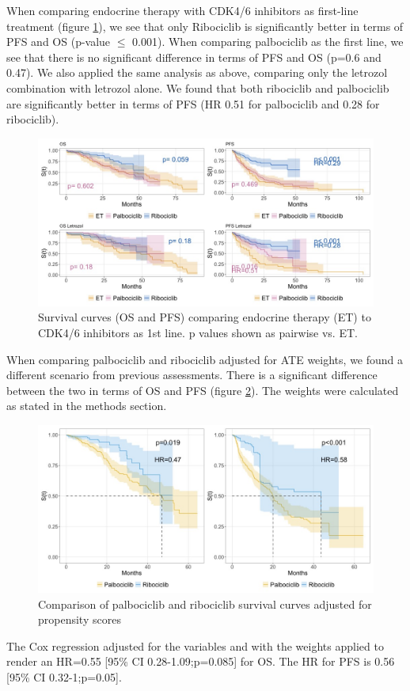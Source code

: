 When comparing endocrine therapy with CDK4/6 inhibitors as first-line treatment (figure \ref*{fig:grouped}), we see that only Ribociclib is significantly better in terms of PFS and OS (p-value $\le$ 0.001). When comparing palbociclib as the first line, we see that there is no significant difference in terms of PFS and OS (p=0.6 and 0.47).
We also applied the same analysis as above, comparing only the letrozol combination with letrozol alone. We found that both ribociclib and palbociclib are significantly better in terms of PFS (HR 0.51 for palbociclib and 0.28 for ribociclib).
\begin{figure}[ht]
  \centering

  \caption{Survival curves (OS and PFS) comparing endocrine therapy (ET) to CDK4/6 inhibitors as 1st line. p values shown as pairwise vs. ET. }\label{fig:grouped} 
  \includegraphics[scale=0.42]{figures/grouped_curve_both.jpeg}%

\end{figure}

When comparing palbociclib and ribociclib adjusted for ATE weights, we found a different scenario from previous assessments. There is a significant difference between the two in terms of OS and PFS (figure \ref*{fig:propensity}). The weights were calculated as stated in the methods section.

\begin{figure}[ht]
  \centering

  \caption{Comparison of palbociclib and ribociclib survival curves adjusted for propensity scores  }\label{fig:propensity} 
  \includegraphics[scale=0.38]{figures/propensity_score_both.jpeg}%

\end{figure}

The Cox regression adjusted for the variables and with the weights applied to render an HR=0.55 [95\% CI 0.28-1.09;p=0.085] for OS. The HR for PFS is 0.56 [95\% CI 0.32-1;p=0.05].